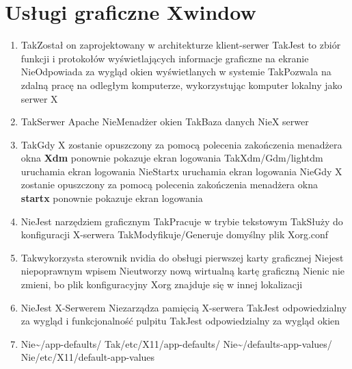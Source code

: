 \section{Usługi graficzne Xwindow}

\begin{enumerate}
	
	\item {}
	{Tak}{Został on zaprojektowany w architekturze klient-serwer}
	{Tak}{Jest to zbiór funkcji i protokołów wyświetlających informacje graficzne na ekranie}
	{Nie}{Odpowiada za wygląd okien wyświetlanych w systemie}
	{Tak}{Pozwala na zdalną pracę na odległym komputerze, wykorzystując komputer lokalny jako serwer X}

	\item {}
	{Tak}{Serwer Apache}
	{Nie}{Menadżer okien}
	{Tak}{Baza danych}
	{Nie}{X serwer}
	
	\item {}
	{Tak}{Gdy X zostanie opuszczony za pomocą polecenia zakończenia menadżera okna \textbf{Xdm} ponownie pokazuje ekran logowania}
	{Tak}{Xdm/Gdm/lightdm uruchamia ekran logowania}
	{Nie}{Startx uruchamia ekran logowania}
	{Nie}{Gdy X zostanie opuszczony za pomocą polecenia zakończenia menadżera okna \textbf{startx} ponownie pokazuje ekran logowania}
	
	\item {}
	{Nie}{Jest narzędziem graficznym}
	{Tak}{Pracuje w trybie tekstowym}
	{Tak}{Służy do konfiguracji X-serwera}
	{Tak}{Modyfikuje/Generuje domyślny plik Xorg.conf}

	\item {}
	{Tak}{wykorzysta sterownik nvidia do obsługi pierwszej karty graficznej}
	{Nie}{jest niepoprawnym wpisem}
	{Nie}{utworzy nową wirtualną kartę graficzną}
	{Nie}{nic nie zmieni, bo plik konfiguracyjny Xorg znajduje się w innej lokalizacji}
	
	\item {}
	{Nie}{Jest X-Serwerem}
	{Nie}{zarządza pamięcią X-serwera}
	{Tak}{Jest odpowiedzialny za wygląd i funkcjonalność pulpitu}
	{Tak}{Jest odpowiedzialny za wygląd okien}
	
	\item {}
	{Nie}{\textasciitilde/app-defaults/}
	{Tak}{/etc/X11/app-defaults/}
	{Nie}{\textasciitilde/defaults-app-values/}
	{Nie}{/etc/X11/default-app-values}
	

\end{enumerate}
